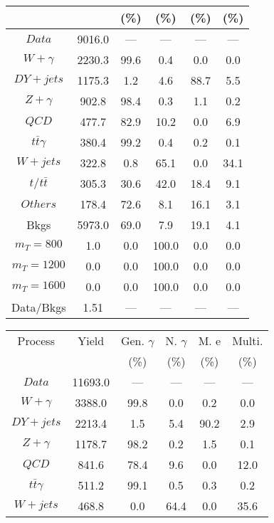 \begin{figure}
\begin{minipage}[c]{0.32\textwidth}
{\begin{tabular}{cccccc}
 &  & (\%) & (\%) & (\%) & (\%)  \\
\hline
                                                                      $ Data $ &  9016.0 &  --- &  --- &  --- &  ---\\
$ W+\gamma $ &  2230.3 &  99.6 &  0.4 &  0.0 &  0.0\\
$ DY+jets $ &  1175.3 &  1.2 &  4.6 &  88.7 &  5.5\\
$ Z+\gamma $ &  902.8 &  98.4 &  0.3 &  1.1 &  0.2\\
$ QCD $ &  477.7 &  82.9 &  10.2 &  0.0 &  6.9\\
$ t\bar{t}\gamma $ &  380.4 &  99.2 &  0.4 &  0.2 &  0.1\\
$ W+jets $ &  322.8 &  0.8 &  65.1 &  0.0 &  34.1\\
$ t/t\bar{t} $ &  305.3 &  30.6 &  42.0 &  18.4 &  9.1\\
$ Others $ &  178.4 &  72.6 &  8.1 &  16.1 &  3.1\\
Bkgs &  5973.0 &  69.0 &  7.9 &  19.1 &  4.1\\
$ m_{T} = 800 $ &  1.0 &  0.0 &  100.0 &  0.0 &  0.0\\
$ m_{T} = 1200 $ &  0.0 &  0.0 &  100.0 &  0.0 &  0.0\\
$ m_{T} = 1600 $ &  0.0 &  0.0 &  100.0 &  0.0 &  0.0\\
Data/Bkgs &  1.51 &  --- &  --- &  --- &  ---\\
\hline
\end{tabular}
}
\end{minipage}
\begin{minipage}[c]{0.32\textwidth}
\centering
\tiny{
\begin{tabular}{cccccc}
\hline
Process & Yield & Gen. $\gamma$ & N. $\gamma$ & M. e & Multi. \\
 &  & (\%) & (\%) & (\%) & (\%)  \\
\hline
                                                                      $ Data $ &  11693.0 &  --- &  --- &  --- &  ---\\
$ W+\gamma $ &  3388.0 &  99.8 &  0.0 &  0.2 &  0.0\\
$ DY+jets $ &  2213.4 &  1.5 &  5.4 &  90.2 &  2.9\\
$ Z+\gamma $ &  1178.7 &  98.2 &  0.2 &  1.5 &  0.1\\
$ QCD $ &  841.6 &  78.4 &  9.6 &  0.0 &  12.0\\
$ t\bar{t}\gamma $ &  511.2 &  99.1 &  0.5 &  0.3 &  0.2\\
$ W+jets $ &  468.8 &  0.0 &  64.4 &  0.0 &  35.6\\

\end{tabular}}
\end{minipage}
\end{figure}
